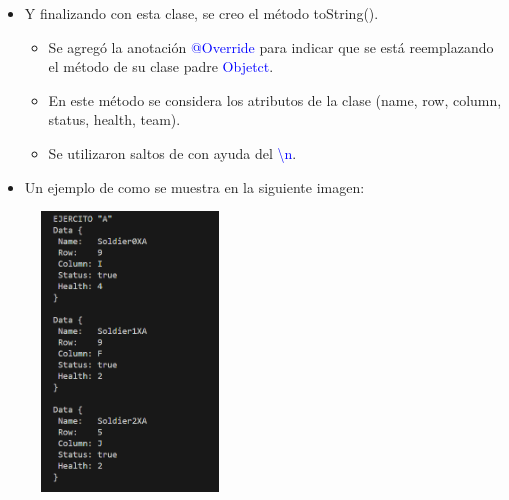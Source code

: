 \documentclass{article}
\begin{document}
        \begin{itemize}
            \item Y finalizando con esta clase, se creo el método toString().
            \begin{itemize}
                \item Se agregó la anotación \textcolor{blue}{@Override} para indicar que se está reemplazando el método de su clase padre \textcolor{blue}{Objetct}.
                \item En este método se considera los atributos de la clase (name, row, column, status, health, team).
                \item Se utilizaron saltos de con ayuda del \textcolor{blue}{\textbackslash n}.
            \end{itemize}
        \end{itemize}

        
\newpage
        \begin{itemize}
            \begin{itemize}
                \item Un ejemplo de como se muestra en la siguiente imagen:
            \end{itemize}
        \end{itemize}
            
        \begin{figure}[H]
            \centering
            \includegraphics[width=0.42\textwidth,keepaspectratio]{img/toString.png}
            \caption{}
        \end{figure}
     
\end{document}
